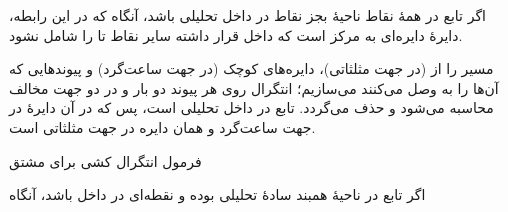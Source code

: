 \begin{EMtheorem}{}

اگر تابع  در همهٔ نقاط ناحیهٔ  بجز نقاط  در داخل  تحلیلی باشد، آنگاه
که در این رابطه، دایرهٔ  دایره‌ای به مرکز  است که داخل  قرار داشته سایر نقاط  تا  را شامل نشود.

\end{EMtheorem}

\begin{EMjoin}

\begin{EMunit}


\end{EMunit}

\begin{EMproof}{}

مسیر \EMim{\Gamma} را از  (در جهت مثلثاتی)، دایره‌های کوچک  (در جهت ساعت‌گرد) و پیوندهایی که آن‌ها را به  وصل می‌کنند می‌سازیم؛ انتگرال روی هر پیوند دو بار و در دو جهت مخالف محاسبه می‌شود و حذف می‌گردد. تابع در داخل \EMim{\Gamma} تحلیلی است، پس
که در آن  دایرهٔ  در جهت ساعت‌گرد و  همان دایره در جهت مثلثاتی است.

\end{EMproof}

\end{EMjoin}

\begin{EMunit}


\end{EMunit}

\EMhold


\begin{EMtheorem}{فرمول انتگرال کشی برای مشتق}

اگر تابع  در ناحیهٔ همبند سادهٔ  تحلیلی بوده و  نقطه‌ای در داخل  باشد، آنگاه

\end{EMtheorem}

